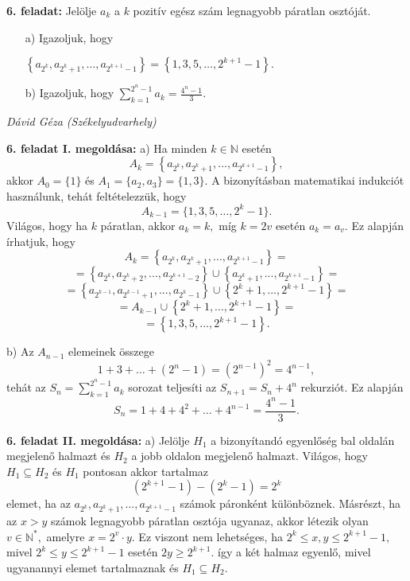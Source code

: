 \documentclass[a4paper,10pt]{article}
\def\ki#1#2{\hfill {\it #1 (#2)}\medskip}
\begin{document}
\medskip
\eject
{\bf 6. feladat: } Jelölje $a_k$ a $k$ pozitív egész szám legnagyobb páratlan osztóját.
\begin{itemize}
\item[a)] Igazoljuk, hogy

\centerline{ $\displaystyle \left\{ {a_{2^k } ,a_{2^k  + 1}
,\ldots,a_{2^{k + 1} - 1} } \right\} = \left\{ {1,3,5,\ldots,2^{k +
1} - 1} \right\}.$}

\item[b)] Igazoljuk, hogy $\displaystyle \sum\limits_{k = 1}^{2^n  - 1} {a_k }  =
\frac{{4^n  - 1}}{3}.$
\end{itemize}

\ki{Dávid Géza}{Székelyudvarhely}\medskip


\textbf{6. feladat I. megoldása: }  a) Ha minden $k\in \mathbb{N}$ esetén $$A_k=\left\{ {a_{2^k } ,a_{2^k  + 1}
,...,a_{2^{k + 1} - 1} } \right\},$$ akkor $A_0=\{1\}$ és
$A_1=\{a_2,a_3\}=\{1,3\}.$ A bizonyításban matematikai
indukciót használunk, tehát feltételezzük, hogy
$$A_{k-1}=\{1,3,5,\ldots, 2^k-1\}.$$ Világos, hogy ha $k$ páratlan, akkor $a_k=k,$
míg $k=2v$ esetén $a_k=a_v.$ Ez alapján írhatjuk, hogy
$$A_k=\left\{ {a_{2^k } ,a_{2^k  + 1}
,...,a_{2^{k + 1} - 1} } \right\}=$$ $$=\left\{ {a_{2^k } ,a_{2^k
+2} ,...,a_{2^{k + 1} - 2} } \right\}\cup \left\{a_{2^k + 1}
,...,a_{2^{k + 1} - 1} \right\}=$$
$$=\left\{ {a_{2^{k-1} } ,a_{2^{k-1}
+1} ,...,a_{2^{k } - 1} } \right\}\cup \left\{2^k + 1,...,2^{k + 1}
- 1 \right\}=$$
$$=A_{k-1}\cup \left\{2^k + 1,...,2^{k + 1}
- 1 \right\}=$$
$$= \left\{ {1,3,5,...,2^{k + 1}  -
1} \right\}.$$

b) Az $A_{n-1}$ elemeinek összege $$1+3+\ldots +
(2^n-1)=(2^{n-1})^2=4^{n-1},$$ tehát az $S_n= \sum\limits_{k =
1}^{2^n - 1} {a_k }$ sorozat teljesíti az $S_{n+1}=S_n+4^n$
rekurziót. Ez alapján $$S_n=1+4+4^2+\ldots
+4^{n-1}=\frac{4^n-1}{3}.$$

\medskip


\textbf{6. feladat II. megoldása: }  a) Jelölje $H_1$
a bizonyítandó egyenlőség bal oldalán megjelenő
halmazt és $H_2$ a jobb oldalon megjelenő halmazt. Világos,
hogy $H_1\subseteq H_2$ és $H_1$ pontosan akkor tartalmaz
$$(2^{k + 1}  - 1) - (2^k  - 1) = 2^k $$ elemet, ha az $a_{2^k }, a_{2^k  + 1}
,\ldots, a_{2^{k + 1} - 1}$ számok páronként
különböznek. Másrészt, ha az $x>y$ számok legnagyobb
páratlan \linebreak osztója ugyanaz, akkor létezik olyan $v\in
\mathbb{N}^*,$ amelyre $x=2^v\cdot y.$ Ez viszont nem lehetséges,
ha $2^k\leq x,y\leq 2^{k+1}-1,$ mivel $2^k\leq y\leq 2^{k+1}-1 $
esetén $2y\geq 2^{k+1}.$ így a két halmaz egyenlő, mivel
ugyanannyi elemet tartalmaznak és $H_1\subseteq H_2.$
\end{document}
